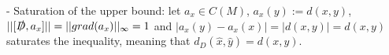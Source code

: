     - Saturation of the upper bound: let $a_x \in C(M)$, $a_x(y) := d(x, y)$, %
    $||[\slashed D, a_x]|| = ||grad(a_x)||_\infty = 1$ and $|a_x(y) - a_x(x)| = |d(x,y)| = d(x,y)$ saturates the inequality, meaning that $ d_D(\hat x, \hat y) = d(x, y)$.
    
\linea